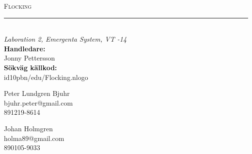 \begin{titlepage}
	\begin{center}
		\vspace*{\fill}
		\Large\textsc{Flocking}\\
		\rule{\linewidth}{0.1mm}\\[0.5cm]
		\large\textit{Laboration 2, Emergenta System, VT -14}\\[1cm]
		\textbf{Handledare:}\\
		Jonny Pettersson\\[8cm]
		\textbf{Sökväg källkod:}\\
		id10pbn/edu/Flocking.nlogo\\[1cm]
		\begin{minipage}{0.4\textwidth}
			\begin{flushleft} \large
				Peter Lundgren Bjuhr\\
				bjuhr.peter@gmail.com\\
				891219-8614
			\end{flushleft}
		\end{minipage}
		\begin{minipage}{0.4\textwidth}
			\begin{flushright} \large
				Johan Holmgren\\
				holma89@gmail.com\\
				890105-9033
			\end{flushright}
		\end{minipage}
		\vspace*{\fill}
	\end{center}
\end{titlepage}